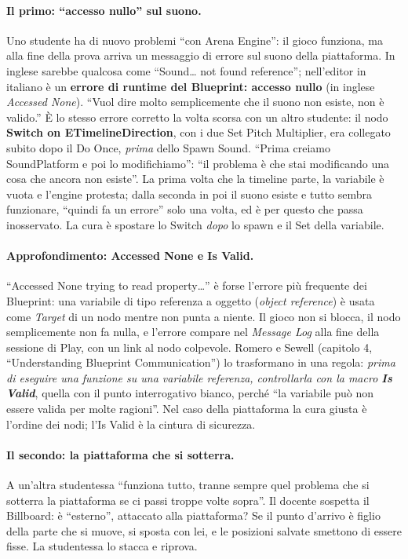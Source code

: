 \paragraph{Il primo: ``accesso nullo'' sul suono.} Uno studente ha di nuovo problemi
``con Arena Engine'': il gioco funziona, ma alla fine della prova arriva un messaggio di
errore sul suono della piattaforma. In inglese sarebbe qualcosa come ``Sound\ldots{} not
found reference''; nell'editor in italiano è un \textbf{errore di runtime del Blueprint:
accesso nullo} (in inglese \emph{Accessed None}). ``Vuol dire molto semplicemente che il
suono non esiste, non è valido.'' È lo stesso errore corretto la volta scorsa con un
altro studente: il nodo \textbf{Switch on ETimelineDirection}, con i due Set Pitch
Multiplier, era collegato subito dopo il Do Once, \emph{prima} dello Spawn Sound. ``Prima
creiamo SoundPlatform e poi lo modifichiamo'': ``il problema è che stai modificando una
cosa che ancora non esiste''. La prima volta che la timeline parte, la variabile è vuota
e l'engine protesta; dalla seconda in poi il suono esiste e tutto sembra funzionare,
``quindi fa un errore'' solo una volta, ed è per questo che passa inosservato. La cura è
spostare lo Switch \emph{dopo} lo spawn e il Set della variabile.

\paragraph{Approfondimento: Accessed None e Is Valid.} ``Accessed None trying to read
property\ldots'' è forse l'errore più frequente dei Blueprint: una variabile di tipo
referenza a oggetto (\emph{object reference}) è usata come \emph{Target} di un nodo
mentre non punta a niente. Il gioco non si blocca, il nodo semplicemente non fa nulla, e
l'errore compare nel \emph{Message Log} alla fine della sessione di Play, con un link al
nodo colpevole. Romero e Sewell (capitolo 4, ``Understanding Blueprint
Communication'') lo trasformano in una regola: \emph{prima di eseguire una funzione su
una variabile referenza, controllarla con la macro \textbf{Is Valid}}, quella con il
punto interrogativo bianco, perché ``la variabile può non essere valida per molte
ragioni''. Nel caso della piattaforma la cura giusta è l'ordine dei nodi; l'Is Valid è
la cintura di sicurezza.

\paragraph{Il secondo: la piattaforma che si sotterra.} A un'altra studentessa
``funziona tutto, tranne sempre quel problema che si sotterra la piattaforma se ci passi
troppe volte sopra''. Il docente sospetta il Billboard: è ``esterno'', attaccato alla
piattaforma? Se il punto d'arrivo è figlio della parte che si muove, si sposta con lei,
e le posizioni salvate smettono di essere fisse. La studentessa lo stacca e riprova.

